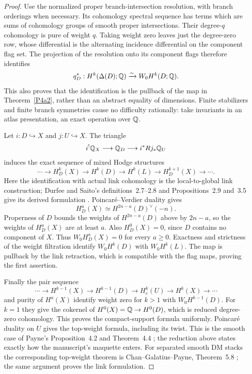 \begin{proof}
Use the normalized proper branch-intersection resolution, with branch orderings when necessary.  Its cohomology spectral sequence has terms which are sums of cohomology groups of smooth proper intersections.  Their degree-$q$ cohomology is pure of weight $q$.  Taking weight zero leaves just the degree-zero row, whose differential is the alternating incidence differential on the component flag set.  The projection of the resolution onto its component flags therefore identifies
\[
 q_D^*:H^k(\Delta(D);\mathbb Q)\xrightarrow{\sim}W_0H^k(D;\mathbb Q).
\]
This also proves that the identification is the pullback of the map in Theorem~\ref{P4a2}, rather than an abstract equality of dimensions.  Finite stabilizers and finite branch symmetries cause no difficulty rationally: take invariants in an atlas presentation, an exact operation over $\mathbb Q$.

Let $i:D\hookrightarrow X$ and $j:U\hookrightarrow X$.  The triangle
\[
 i^!\mathbb Q_X\longrightarrow\mathbb Q_D\longrightarrow i^*Rj_*\mathbb Q_U
\]
induces the exact sequence of mixed Hodge structures
\[
 \cdots\to H_D^k(X)\to H^k(D)\to H^k(L)
       \to H_D^{k+1}(X)\to\cdots.
\]
Here the identification with actual link cohomology is the local-to-global link construction; Durfee and Saito's definitions~2.7--2.8 and Propositions~2.9 and~3.5 give its derived formulation \cite{DurfeeSaito1990}.  Poincar\'e--Verdier duality gives
\[
 H_D^a(X)\simeq H^{2n-a}(D)^\vee(-n).
\]
Properness of $D$ bounds the weights of $H^{2n-a}(D)$ above by $2n-a$, so the weights of $H_D^a(X)$ are at least $a$.  Also $H_D^0(X)=0$, since $D$ contains no component of $X$.  Thus $W_0H_D^a(X)=0$ for every $a\ge0$.  Exactness and strictness of the weight filtration identify $W_0H^k(D)$ with $W_0H^k(L)$.  The map is pullback by the link retraction, which is compatible with the flag maps, proving the first assertion.

Finally the pair sequence
\[
 \cdots\to H^{k-1}(X)\to H^{k-1}(D)\to H_c^k(U)
       \to H^k(X)\to\cdots
\]
and purity of $H^a(X)$ identify weight zero for $k>1$ with $W_0H^{k-1}(D)$.  For $k=1$ they give the cokernel of $H^0(X)=\mathbb Q\to H^0(D)$, which is reduced degree-zero cohomology.  This proves the compact-support formula uniformly.  Poincar\'e duality on $U$ gives the top-weight formula, including its twist.  This is the smooth case of Payne's Proposition~4.2 and Theorem~4.4 \cite{Payne2013}; the reduction above states exactly how the manuscript's maquette enters.  For separated smooth DM stacks the corresponding top-weight theorem is Chan--Galatius--Payne, Theorem~5.8 \cite{CGP2021}; the same argument proves the link formulation.
\end{proof}

